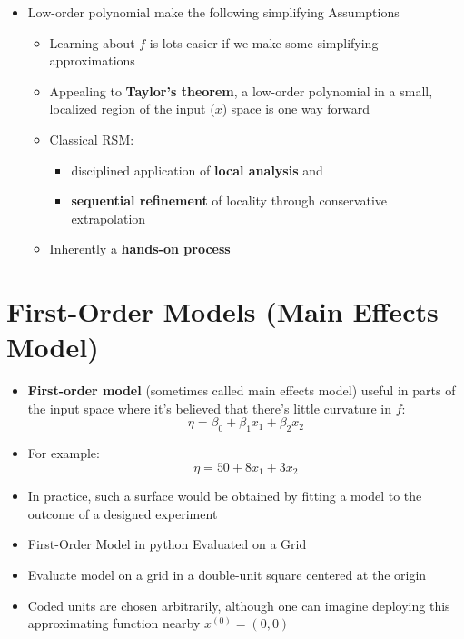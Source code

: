 \documentclass[
  letterpaper,
  DIV=11,
  numbers=noendperiod]{scrreprt}
\providecommand{\tightlist}{%
  \setlength{\itemsep}{0pt}\setlength{\parskip}{0pt}}\usepackage{longtable,booktabs,array}
\begin{document}
\begin{itemize}
\tightlist
\item
  Low-order polynomial make the following simplifying Assumptions

  \begin{itemize}
  \tightlist
  \item
    Learning about \(f\) is lots easier if we make some simplifying
    approximations
  \item
    Appealing to \textbf{Taylor's theorem}, a low-order polynomial in a
    small, localized region of the input (\(x\)) space is one way
    forward
  \item
    Classical RSM:

    \begin{itemize}
    \tightlist
    \item
      disciplined application of \textbf{local analysis} and
    \item
      \textbf{sequential refinement} of locality through conservative
      extrapolation
    \end{itemize}
  \item
    Inherently a \textbf{hands-on process}
  \end{itemize}
\end{itemize}

\section{First-Order Models (Main Effects
Model)}\label{first-order-models-main-effects-model}

\begin{itemize}
\tightlist
\item
  \textbf{First-order model} (sometimes called main effects model)
  useful in parts of the input space where it's believed that there's
  little curvature in \(f\):
  \[\eta = \beta_0 + \beta_1 x_1 + \beta_2 x_2 \]
\item
  For example: \[\eta = 50 + 8 x_1 + 3x_2\]
\item
  In practice, such a surface would be obtained by fitting a model to
  the outcome of a designed experiment
\item
  First-Order Model in python Evaluated on a Grid
\item
  Evaluate model on a grid in a double-unit square centered at the
  origin
\item
  Coded units are chosen arbitrarily, although one can imagine deploying
  this approximating function nearby \(x^{(0)} = (0,0)\)
\end{itemize}
\end{document}
